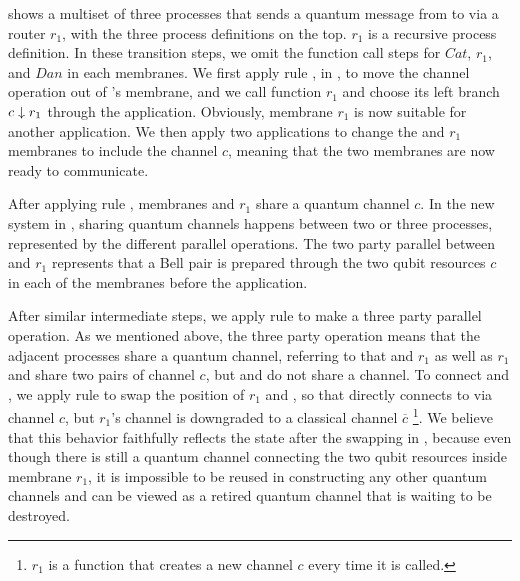  shows a multiset of three processes that sends a quantum message from  to  via a router $r_1$,
with the three process definitions on the top. $r_1$ is a recursive process definition. In these transition steps, we omit the function call steps for $Cat$, $r_1$, and $Dan$ in each membranes.
We first apply rule , in , to move the channel operation out of 's membrane, and we call function $r_1$ and choose its left branch $c\downarrow r_1$ through the  application.
Obviously, membrane $r_1$ is now suitable for another  application.
We then apply two  applications to change the  and $r_1$ membranes to include the channel $c$,
meaning that the two membranes are now ready to communicate.

After applying rule , membranes  and $r_1$ share a quantum channel $c$.
In the new system in , sharing quantum channels happens between two or three processes, represented by the different parallel operations. The two party parallel between  and $r_1$ represents that a Bell pair is prepared through the two qubit resources $c$ in each of the membranes before the application.

After similar intermediate steps, we apply rule  to make a three party parallel operation.
As we mentioned above, the three party operation means that the adjacent processes share a quantum channel, referring to that  and $r_1$ as well as $r_1$ and  share two pairs of channel $c$, but  and  do not share a channel.
To connect  and , we apply rule  to swap the position of $r_1$ and , so that  directly connects to  via channel $c$, but $r_1$'s channel is downgraded to a classical channel $\overline{c}$ \footnote{$r_1$ is a function that creates a new channel $c$ every time it is called.}.
We believe that this behavior faithfully reflects the state after the swapping in ,
because even though there is still a quantum channel connecting the two qubit resources inside membrane $r_1$,
it is impossible to be reused in constructing any other quantum channels
and can be viewed as a retired quantum channel that is waiting to be destroyed. 

